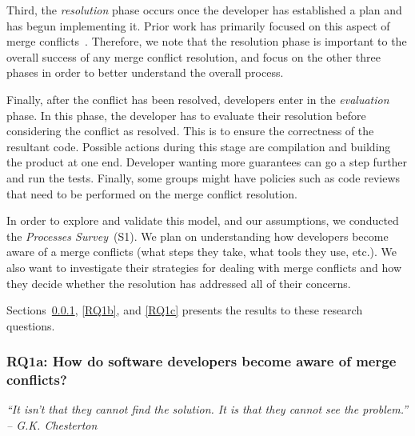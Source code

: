 Third, the \emph{resolution} phase occurs once the developer has established a plan and has begun implementing it.
Prior work has primarily focused on this aspect of merge conflicts~\cite{nishimura,mens2002state,Brun2011}.
Therefore, we note that the resolution phase is important to the overall success of any merge conflict resolution, and focus on the other three phases in order to better understand the overall process.

Finally, after the conflict has been resolved, developers enter in the \emph{evaluation} phase.
In this phase, the developer has to evaluate their resolution before considering the conflict as resolved.
This is to ensure the correctness of the resultant code.
Possible actions during this stage are compilation and building the product at one end.
Developer wanting more guarantees can go a step further and run the tests.
Finally, some groups might have policies such as code reviews that need to be performed on the merge conflict resolution.
 
In order to explore and validate this model, and our assumptions, we conducted the \emph{Processes Survey}~(S1).
We plan on understanding how developers become aware of a merge conflicts (what steps they take, what tools they use, etc.).
We also want to investigate their strategies for dealing with merge conflicts and how they decide whether the resolution has addressed all of their concerns.

Sections~\ref{RQ1a}, \ref{RQ1b}, and \ref{RQ1c} presents the results to these research questions.

\subsubsection{\textbf{RQ1a:} How do software developers become \textbf{aware} of merge conflicts?}\label{RQ1a}
\vspace*{-0.5\baselineskip}
\begin{quoting}
\textit{``It isn't that they cannot find the solution. It is that they cannot see the problem.'' -- G.K. Chesterton}
\end{quoting}
\vspace*{+0.3\baselineskip}

